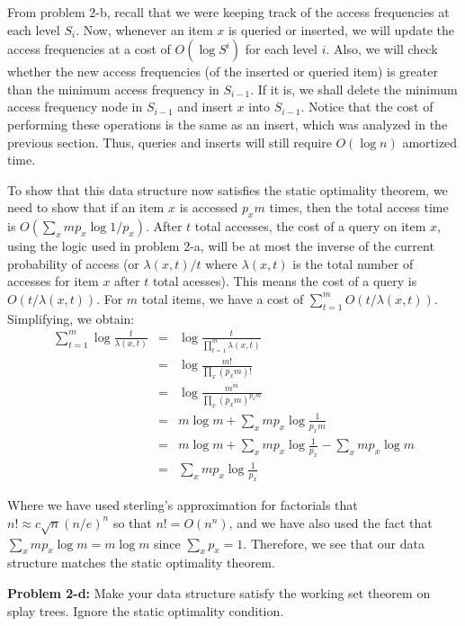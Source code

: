 \documentclass[psamsfonts]{amsart}
\newenvironment{sol}{\vspace{0.25cm}{\large \bfseries Solution:}}{\qedsymbol}
\newenvironment{prob}[1]{\begin{framed}{\large \bfseries Problem #1:}}{\end{framed}}
\begin{document}
\begin{sol}
From problem 2-b, recall that we were keeping track of the access frequencies at each level $S_i$. Now, whenever an item $x$ is queried or inserted, we will update the access frequencies at a cost of $O(\log S^i)$ for each level $i$. Also, we will check whether the new access frequencies (of the inserted or queried item) is greater than the minimum access frequency in $S_{i-1}$. If it is, we shall delete the minimum access frequency node in $S_{i-1}$ and insert $x$ into $S_{i-1}$. Notice that the cost of performing these operations is the same as an insert, which was analyzed in the previous section. Thus, queries and inserts will still require $O(\log n)$ amortized time. 

To show that this data structure now satisfies the static optimality theorem, we need to show that if an item $x$ is accessed $p_x m$ times, then the total access time is $O(\sum_{x} m p_x \log 1/p_x)$. After $t$ total accesses, the cost of a query on item $x$, using the logic used in problem 2-a, will be at most the inverse of the current probability of access (or $\lambda(x,t)/t$ where $\lambda(x,t)$ is the total number of accesses for item $x$ after $t$ total acesses). This means the cost of a query is $O(t/\lambda(x,t))$. For $m$ total items, we have a cost of $\sum_{t=1}^m O(t/\lambda(x,t))$. Simplifying, we obtain:
\begin{eqnarray}
\sum_{t=1}^m \log \frac{t}{\lambda(x,t)} &=& \log \frac{t}{\prod_{t=1}^m \lambda(x,t)} \\
&=& \log \frac{m!}{\prod_{x}(p_x m)!} \\
&=& \log \frac{m^{m}}{\prod_{x}(p_x m)^{p_x m}} \\
&=& m \log m + \sum_{x} m p_x \log \frac{1}{p_xm} \\
&=& m \log m + \sum_{x} m p_x \log \frac{1}{p_x} - \sum_x m p_x \log m \\
&=& \sum_{x} m p_x \log \frac{1}{p_x}
\end{eqnarray}

Where we have used sterling's approximation for factorials that $n! \approx c\sqrt{n}(n/e)^n$ so that $n! = O(n^n)$, and we have also used the fact that $\sum_{x} m p_x \log m = m \log m$ since $\sum_{x} p_x = 1$. Therefore, we see that our data structure matches the static optimality theorem.
\end{sol}

\begin{prob}{2-d}
Make your data structure satisfy the working set theorem on splay trees. Ignore the static optimality condition.
\end{prob}
\end{document}
